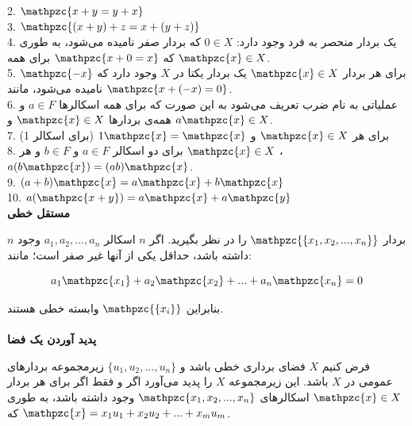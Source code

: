 \documentclass[a4paper,12pt]{report}
\begin{document}
   	2. $ \mathpzc{x+y=y+x} $\\
   	
   	3. $ \mathpzc{(x+y)+z=x+(y+z)} $\\
   	
   	4.	یک بردار منحصر به فرد وجود دارد:
   	$ 0 \in X $
   	که بردار صفر نامیده می‌شود، به طوری که
   	$ \mathpzc{x+0=x} $ 
   	برای همه
   	$ \mathpzc{x} \in X $.\\
   	
   	5. برای هر بردار 
   	$ \mathpzc{x} \in X $
   	یک بردار یکتا در $ X $ وجود دارد که
   	$ \mathpzc{-x} $
   	نامیده می‌شود، مانند 
   	$ \mathpzc{x+(-x)=0} $.\\
   	
   	6. عملیاتی به نام ضرب تعریف می‌شود به این صورت که برای همه اسکالرها 
   	$ a \in F $
   	و همه‌ی بردارها
   	$ \mathpzc{x} \in X $ و $ a\mathpzc{x} \in X $.\\
   	
   	7. برای هر 
   	$ \mathpzc{x} \in X $
   	و
   	$ 1\mathpzc{x}=\mathpzc{x} $
   	(برای اسکالر 1)\\
   	
   	8. برای دو اسکالر $ a \in F $ و $ b \in F $ و هر 
   	$ \mathpzc{x} \in X $ ، $ a(b\mathpzc{x})=(ab)\mathpzc{x} $.\\
   	
   	9. $ (a+b)\mathpzc{x}=a\mathpzc{x}+b\mathpzc{x} $\\
   	
   	10. $ a(\mathpzc{x+y}) = a\mathpzc{x}+a\mathpzc{y} $\\
   	
   	\textbf{\large{مستقل خطی}}
   	
   	$ n $ بردار
   	$ \mathpzc{\{x_1, x_2, ... ,x_n\}} $
   	را در نظر بگیرید. اگر $ n $ اسکالر
   	$ a_1, a_2, ... ,a_n $
   	وجود داشته باشد، حداقل یکی از آنها غیر صفر است؛ مانند:
   	
   	$$
   	a_1\mathpzc{x_1} + a_2\mathpzc{x_2} + ... + a_n\mathpzc{x_n} = 0
   	$$
   	
   	بنابراین 
   	$ \mathpzc{\{ x_i \}} $
   	وابسته خطی هستند.\\\\
   	
   	\textbf{\large{پدید آوردن یک فضا}}
   	
   	فرض کنیم $ X $ فضای برداری خطی باشد و $ \{ u_1,u_2,...,u_n \} $ زیرمجموعه بردارهای عمومی در $ X $ باشد. این زیرمجموعه $ X $ را پدید می‌آورد اگر و فقط اگر برای هر بردار 
   	$ \mathpzc{x} \in X $
   	اسکالرهای
   	$ \mathpzc{x_1,x_2,...,x_n} $
   	وجود داشته باشد، به طوری که
   	$ \mathpzc{x} = x_1u_1+x_2u_2+...+x_mu_m $.\\
   	
\end{document}
